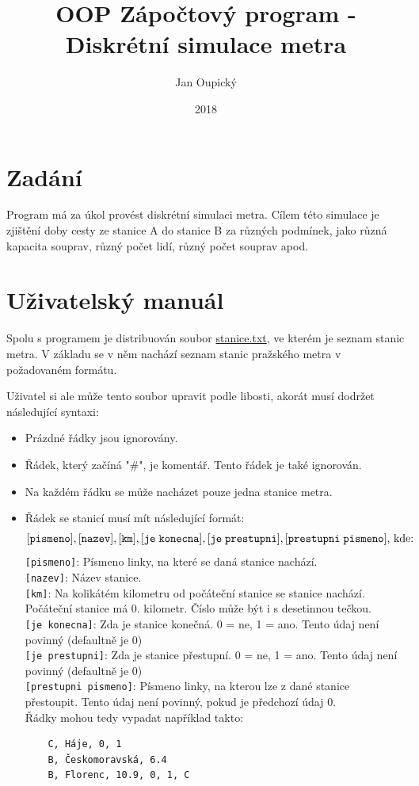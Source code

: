 \documentclass[12pt, a4paper]{article}
\title{OOP Zápočtový program - Diskrétní simulace metra}
\author{Jan Oupický}
\date{2018}
\begin{document}
\maketitle

\section{Zadání}

Program má za úkol provést diskrétní simulaci metra. Cílem této simulace je zjištění doby cesty ze stanice A do stanice B za různých podmínek, jako různá kapacita souprav, různý počet lidí, různý počet souprav apod. 

\section{Uživatelský manuál}

Spolu s programem je distribuován soubor \url{stanice.txt}, ve kterém je seznam stanic metra. V základu se v něm nachází seznam stanic pražského metra v požadovaném formátu.

Uživatel si ale může tento soubor upravit podle libosti, akorát musí dodržet následující syntaxi:

\begin{itemize}
    \item Prázdné řádky jsou ignorovány.
    \item Řádek, který začíná "\#", je komentář. Tento řádek je také ignorován.
    \item Na každém řádku se může nacházet pouze jedna stanice metra.
    \item Řádek se stanicí musí mít následující formát:
    \[ %
    \displayindent0pt
    \displaywidth\textwidth
    \mathtt{[pismeno], [nazev], [km], [je\;konecna], [je\;prestupni], [prestupni\;pismeno]}\text{, kde:}
    \]
    \texttt{[pismeno]}: Písmeno linky, na které se daná stanice nachází.\\
    \texttt{[nazev]}: Název stanice.\\
    \texttt{[km]}: Na kolikátém kilometru od počáteční stanice se stanice nachází. Počáteční stanice má 0. kilometr. Číslo může být i s desetinnou tečkou.\\
    \texttt{[je konecna]}: Zda je stanice konečná. 0 = ne, 1 = ano. Tento údaj není povinný (defaultně je 0)\\
    \texttt{[je prestupni]}: Zda je stanice přestupní. 0 = ne, 1 = ano. Tento údaj není povinný (defaultně je 0)\\
    \texttt{[prestupni pismeno]}: Písmeno linky, na kterou lze z dané stanice přestoupit. Tento údaj není povinný, pokud je předchozí údaj 0.\\
    Řádky mohou tedy vypadat například takto:
    \begin{verbatim}
    C, Háje, 0, 1
    B, Českomoravská, 6.4
    B, Florenc, 10.9, 0, 1, C
    \end{verbatim}
\end{itemize}
\end{document}
